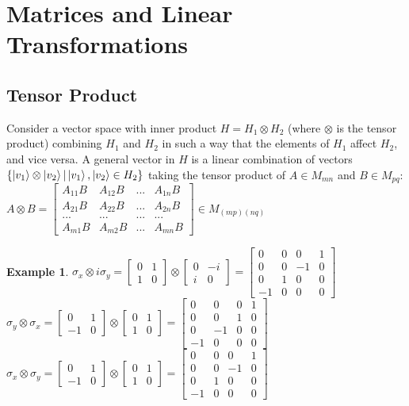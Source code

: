 \documentclass[12pt]{article}
\theoremstyle{plain}
\theoremstyle{nonumberplain}
\theoremstyle{plain}
\newtheorem{example}[lemma]{Example}
\theoremstyle{nonumberplain}
\newcommand\1{{\bf 1}}
\newcommand{\bmat}[1]{\begin{bmatrix*} #1 \end{bmatrix*}} %
\newcommand{\<}{\left\langle}
\renewcommand{\>}{\right\rangle}
\begin{document}
\section{Matrices and Linear Transformations}


\subsection{Tensor Product}
Consider a vector space with inner product $H=H_1\otimes H_2$ (where $\otimes$ is the tensor product) combining $H_1$ and $H_2$ in such a way that the elements of $H_1$ affect $H_2$, and vice versa. A general vector in $H$ is a linear combination of vectors $\lbrace\ket{v_1}\otimes\ket{v_2}\vert\ket{v_1},\ket{v_2}\in H_2\rbrace$ taking the tensor product of $A\in M_{mn}$ and $B\in M_{pq}$: \\
$A\otimes B=\bmat{
A_{11}B & A_{12}B & ... & A_{1n}B \\
A_{21}B & A_{22}B & ... & A_{2n}B \\
... & ... & ... & ... \\
A_{m1}B & A_{m2}B & ... & A_{mn}B
}\in M_{(mp)(nq)}$

\begin{example}
$\sigma_x\otimes i\sigma_y=\bmat{0 & 1 \\ 1 & 0}\otimes\bmat{0 & -i \\ i & 0}=
\bmat{
0 & 0 & 0 & 1 \\
0 & 0 & -1 & 0 \\
0 & 1 & 0 & 0 \\
-1 & 0 & 0 & 0
}$ \\
$\sigma_y\otimes \sigma_x=\bmat{0 & 1 \\ -1 & 0}\otimes\bmat{0 & 1 \\ 1 & 0}=
\bmat{
0 & 0 & 0 & 1 \\
0 & 0 & 1 & 0 \\
0 & -1 & 0 & 0 \\
-1 & 0 & 0 & 0
}$ \\
$\sigma_x\otimes \sigma_y=\bmat{0 & 1 \\ -1 & 0}\otimes\bmat{0 & 1 \\ 1 & 0}=
\bmat{
0 & 0 & 0 & 1 \\
0 & 0 & -1 & 0 \\
0 & 1 & 0 & 0 \\
-1 & 0 & 0 & 0
}$
\end{example}
\end{document}

